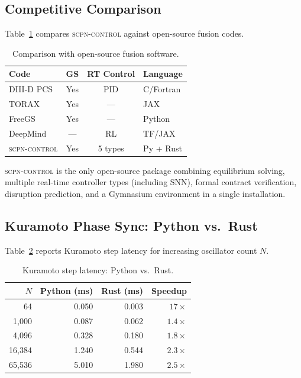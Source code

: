 \documentclass[twocolumn,preprintnumbers,amsmath,amssymb,prl,floatfix]{revtex4-2}
\begin{document}
\subsection{Competitive Comparison}

Table~\ref{tab:competitive} compares \textsc{scpn-control}
against open-source fusion codes.

\begin{table}[tb]
\centering
\caption{Comparison with open-source fusion software.}
\label{tab:competitive}
\begin{tabular}{lccl}
\toprule
Code & GS & RT Control & Language \\
\midrule
DIII-D PCS~\cite{ferron1998} & Yes & PID & C/Fortran \\
TORAX~\cite{fanni2024torax} & Yes & --- & JAX \\
FreeGS~\cite{freegs} & Yes & --- & Python \\
DeepMind~\cite{degrave2022} & --- & RL & TF/JAX \\
\textsc{scpn-control} & Yes & 5 types & Py + Rust \\
\bottomrule
\end{tabular}
\end{table}

\textsc{scpn-control} is the only open-source package combining
equilibrium solving, multiple real-time controller types
(including SNN), formal contract verification, disruption
prediction, and a Gymnasium environment in a single installation.

\subsection{Kuramoto Phase Sync: Python vs.\ Rust}

Table~\ref{tab:kuramoto_bench} reports Kuramoto step latency
for increasing oscillator count $N$.

\begin{table}[tb]
\centering
\caption{Kuramoto step latency: Python vs.\ Rust.}
\label{tab:kuramoto_bench}
\begin{tabular}{rrrr}
\toprule
$N$ & Python (ms) & Rust (ms) & Speedup \\
\midrule
64     & 0.050 & 0.003 & $17\times$ \\
1{,}000  & 0.087 & 0.062 & $1.4\times$ \\
4{,}096  & 0.328 & 0.180 & $1.8\times$ \\
16{,}384 & 1.240 & 0.544 & $2.3\times$ \\
65{,}536 & 5.010 & 1.980 & $2.5\times$ \\
\bottomrule
\end{tabular}
\end{table}
\end{document}
